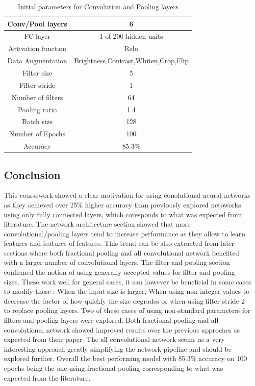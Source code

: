\documentclass[12pt]{article}
\begin{document}
\begin{table}[H]
\centering
\begin{tabular}[h]{| c | c |}
\hline
Conv/Pool layers & 6  \\
\hline
FC layer & 1 of 200 hidden units  \\
\hline
Activation function & Relu  \\
\hline
Data Augmentation & Brightness,Contrast,Whiten,Crop,Flip \\
\hline 
Filter size & 5  \\
\hline
Filter stride & 1   \\
\hline
Number of filters & 64   \\
\hline
Pooling ratio & 1.4  \\
\hline 
Batch size & 128   \\
\hline 
Number of Epochs & 100   \\
\hline 
Accuracy &    85.3\% \\
\hline 
\end{tabular} 
\caption{Initial parameters for Convolution and Pooling layers}
\label{tab:fracres}
\end{table}

\subsection*{Conclusion}
This coursework showed a clear motivation for using conolutional neural networks as they achieved over 25\% higher accuracy than previously explored netoworks using only fully connected layers, which coresponds to what was expected from literature\cite{inspiration}\cite{alexnet}\cite{stan}.
The network architecture section showed that more convolutional/pooling layers tend to increase performance as they allow to learn features and features of features. This trend can be also extracted from later sections where both fractional pooling and all convolutional network benefited with a larger number of convolutional layers.
 The filter and pooling section confirmed the notion of using generally accepted values for filter and pooling sizes\cite{kernel}\cite{inspiration}\cite{bestprac}. These work well for general cases, it can however be beneficial in some cases to modify these : When the input size is larger\cite{alexnet}; When using non integer values to decrease the factor of how quickly the size degrades\cite{frac} or when using filter stride 2 to replace pooling layers\cite{allconv}.
Two of these cases of using non-standard parameters for filters and pooling layers were explored. Both fractional pooling and all convolutional network showed improved results over the previous approches as expected from their paper\cite{frac}\cite{allconv}. The all convolutional network seems as a very interesting approach greatly simplifying the network pipeline and should be explored further. Overall the best performing model with 85.3\% accuracy on 100 epochs being the one using fractional pooling corresponding to what was expected from the literature. 
\end{document}
